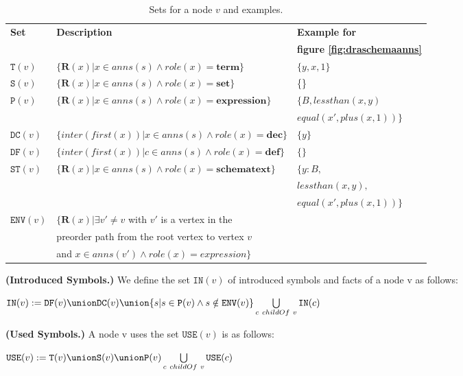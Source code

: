 \begin{table}[H]
\begin{tabular}{|l | l | l |}
\hline
\textbf{Set} & \textbf{Description} & \textbf{Example for} \\
& & \textbf{figure \ref{fig:draschemaanns}} \\
\hline
$\mathtt{T}(v)$ & $\{\mathbf{R}(x)| x \in anns(s) \land role(x) = \mathbf{term}\}$ & $\{y, x, 1\}$ \\
\hline
$\mathtt{S}(v)$ & $\{\mathbf{R}(x)| x \in anns(s) \land role(x) = \mathbf{set}\}$ & \{\} \\
\hline
$\mathtt{P}(v)$ & $\{\mathbf{R}(x)| x \in anns(s) \land role(x) = \mathbf{expression}\}$ & $\{B, lessthan(x, y)$ \\
& & $equal(x',plus(x,1)) \}$\\
\hline
$\mathtt{DC}(v)$ & $\{inter(first(x))| x \in anns(s) \land role(x) = \mathbf{dec}\}$ & $\{y\}$ \\
\hline
$\mathtt{DF}(v)$ & $\{inter(first(x))| c \in anns(s) \land role(x) = \mathbf{def}\}$ & $\{\}$ \\
\hline
$\mathtt{ST}(v)$ & $\{\mathbf{R}(x)| x \in anns(s) \land role(x) = \mathbf{schematext}\}$ & $\{y:B,$ \\
& & $lessthan(x,y),$ \\
& & $equal(x',plus(x,1)) \}$ \\
\hline
$\mathtt{ENV}(v)$ & $\{\mathbf{R}(x) | \exists v' \neq v$ with $v'$ is a vertex in the & \\
& preorder path from the root vertex to vertex $v$ & \\
& and $x \in anns(v') \land role(x) = expression\}$ & \\
\hline
\end{tabular}
\caption{ Sets for a node $v$ and examples. \label{tab:setsfornodes}}
\end{table}

\begin{defin}
\textbf{(Introduced Symbols.)} We define the set $\mathtt{IN}(v)$ of introduced symbols and facts of a node v as follows:

$\mathtt{IN}(v) := \mathtt{DF}(v) \union \mathtt{DC}(v) \union \{s|s \in \mathtt{P}(v) \land s \notin \mathtt{ENV}(v)\} \bigcup\limits_{c\ childOf\ v} \mathtt{IN}(c)$
\end{defin}

\begin{defin}
\textbf{(Used Symbols.)} A node v uses the set $\mathtt{USE}(v)$ is as follows:

$\mathtt{USE}(v) := \mathtt{T}(v) \union \mathtt{S}(v) \union \mathtt{P}(v) \bigcup\limits_{c\ childOf\ v} \mathtt{USE}(c)$
\end{defin}

